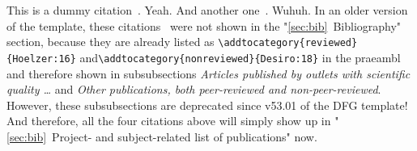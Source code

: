 \documentclass{scrartcl}
\begin{document}
This is a dummy citation~\cite{Hoelzer:17}. Yeah. And another one~\cite{Gerst:18}. Wuhuh. In an older version of the template, these citations~\cite{Hoelzer:16, Desiro:18} were not shown in the "\ref{sec:bib}~Bibliography" section, because they are already listed as \verb=\addtocategory{reviewed}{Hoelzer:16}= and\verb=\addtocategory{nonreviewed}{Desiro:18}= in the praeambl and therefore shown in subsubsections \emph{Articles published by outlets with scientific quality \dots} and \emph{Other publications, both peer-reviewed and non-peer-reviewed}. However, these subsubsections are deprecated since v53.01 of the DFG template! And therefore, all the four citations above will simply show up in "\ref{sec:bib}~Project- and subject-related list of publications" now.

\lipsum[1]




\end{document}
